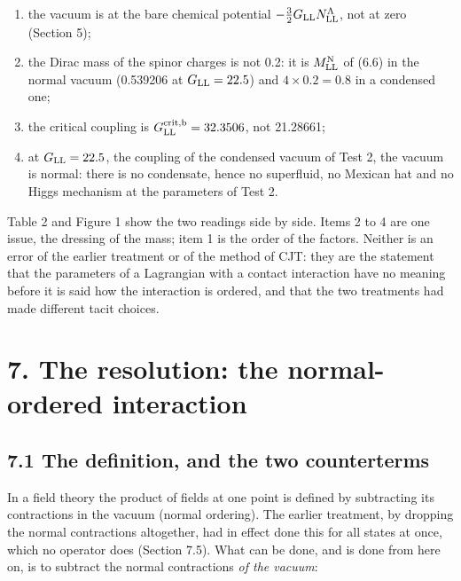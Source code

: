 \documentclass[
  10pt,
]{article}
\providecommand{\tightlist}{%
  \setlength{\itemsep}{0pt}\setlength{\parskip}{0pt}}
\begin{document}
\begin{enumerate}
\def\labelenumi{\arabic{enumi}.}
\tightlist
\item
  the vacuum is at the bare chemical potential
  \(-\tfrac32G_{\rm LL}N^\Lambda_{\rm LL}\), not at zero (Section 5);
\item
  the Dirac mass of the spinor charges is not 0.2: it is
  \(M^{\rm N}_{\rm LL}\) of (6.6) in the normal vacuum (0.539206 at
  \(G_{\rm LL}=22.5\)) and \(4\times0.2=0.8\) in a condensed one;
\item
  the critical coupling is \(G^{\rm crit,b}_{\rm LL}=32.3506\), not
  21.28661;
\item
  at \(G_{\rm LL}=22.5\), the coupling of the condensed vacuum of Test
  2, the vacuum is normal: there is no condensate, hence no superfluid,
  no Mexican hat and no Higgs mechanism at the parameters of Test 2.
\end{enumerate}

Table 2 and Figure 1 show the two readings side by side. Items 2 to 4
are one issue, the dressing of the mass; item 1 is the order of the
factors. Neither is an error of the earlier treatment or of the method
of CJT: they are the statement that the parameters of a Lagrangian with
a contact interaction have no meaning before it is said how the
interaction is ordered, and that the two treatments had made different
tacit choices.

\hypertarget{the-resolution-the-normal-ordered-interaction}{%
\section{7. The resolution: the normal-ordered
interaction}\label{the-resolution-the-normal-ordered-interaction}}

\hypertarget{the-definition-and-the-two-counterterms}{%
\subsection{7.1 The definition, and the two
counterterms}\label{the-definition-and-the-two-counterterms}}

In a field theory the product of fields at one point is defined by
subtracting its contractions in the vacuum (normal ordering). The
earlier treatment, by dropping the normal contractions altogether, had
in effect done this for all states at once, which no operator does
(Section 7.5). What can be done, and is done from here on, is to
subtract the normal contractions \emph{of the vacuum}:
\end{document}
